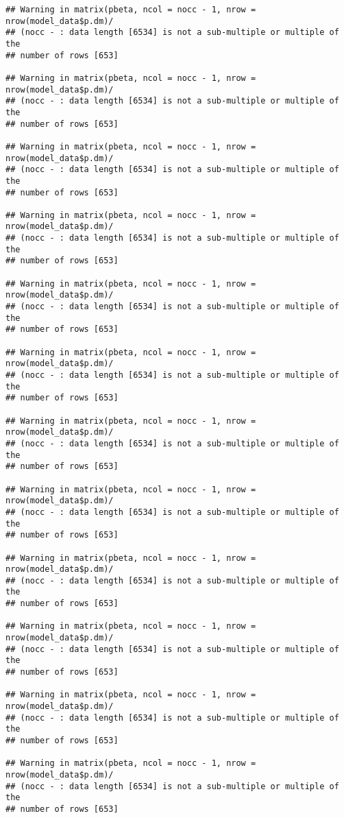 \documentclass[]{article}
\begin{document}
\begin{verbatim}
## Warning in matrix(pbeta, ncol = nocc - 1, nrow = nrow(model_data$p.dm)/
## (nocc - : data length [6534] is not a sub-multiple or multiple of the
## number of rows [653]

## Warning in matrix(pbeta, ncol = nocc - 1, nrow = nrow(model_data$p.dm)/
## (nocc - : data length [6534] is not a sub-multiple or multiple of the
## number of rows [653]

## Warning in matrix(pbeta, ncol = nocc - 1, nrow = nrow(model_data$p.dm)/
## (nocc - : data length [6534] is not a sub-multiple or multiple of the
## number of rows [653]

## Warning in matrix(pbeta, ncol = nocc - 1, nrow = nrow(model_data$p.dm)/
## (nocc - : data length [6534] is not a sub-multiple or multiple of the
## number of rows [653]

## Warning in matrix(pbeta, ncol = nocc - 1, nrow = nrow(model_data$p.dm)/
## (nocc - : data length [6534] is not a sub-multiple or multiple of the
## number of rows [653]

## Warning in matrix(pbeta, ncol = nocc - 1, nrow = nrow(model_data$p.dm)/
## (nocc - : data length [6534] is not a sub-multiple or multiple of the
## number of rows [653]

## Warning in matrix(pbeta, ncol = nocc - 1, nrow = nrow(model_data$p.dm)/
## (nocc - : data length [6534] is not a sub-multiple or multiple of the
## number of rows [653]

## Warning in matrix(pbeta, ncol = nocc - 1, nrow = nrow(model_data$p.dm)/
## (nocc - : data length [6534] is not a sub-multiple or multiple of the
## number of rows [653]

## Warning in matrix(pbeta, ncol = nocc - 1, nrow = nrow(model_data$p.dm)/
## (nocc - : data length [6534] is not a sub-multiple or multiple of the
## number of rows [653]

## Warning in matrix(pbeta, ncol = nocc - 1, nrow = nrow(model_data$p.dm)/
## (nocc - : data length [6534] is not a sub-multiple or multiple of the
## number of rows [653]

## Warning in matrix(pbeta, ncol = nocc - 1, nrow = nrow(model_data$p.dm)/
## (nocc - : data length [6534] is not a sub-multiple or multiple of the
## number of rows [653]

## Warning in matrix(pbeta, ncol = nocc - 1, nrow = nrow(model_data$p.dm)/
## (nocc - : data length [6534] is not a sub-multiple or multiple of the
## number of rows [653]


\end{verbatim}
\end{document}
